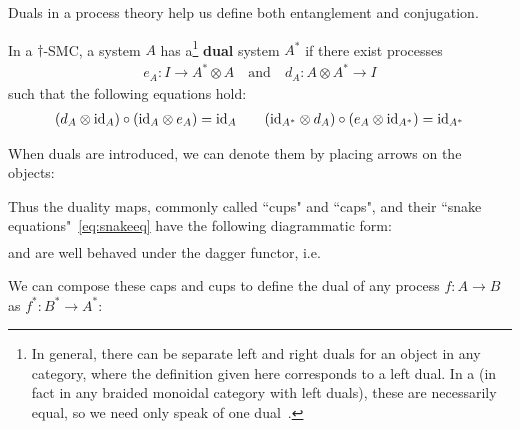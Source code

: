 Duals in a process theory help us define both entanglement and conjugation.

\begin{defn}
\label{def:dual}
In a $\dagger$-SMC, a system $A$ has a\footnote{In general, there can be separate left and right duals for an object in any category, where the definition given here corresponds to a left dual. In a \dsmc(in fact in any braided monoidal category with left duals), these are necessarily equal, so we need only speak of one dual~\cite[Prop.~7.2]{joyal1993braided}. } \textbf{dual} system $A^*$ if there exist processes 
\begin{align}
e_A:I\to A^*\otimes A \quad \mbox{and}\quad d_A:A\otimes A^*\to I
\end{align}
such that the following equations hold:
\begin{align}
\label{eq:snakeeq}
(d_A\otimes \mbox{id}_{A})\circ(\mbox{id}_{A}\otimes e_A) = \mbox{id}_{A} \qquad (\mbox{id}_{A^*}\otimes d_A)\circ(e_A\otimes \mbox{id}_{A^*})=\mbox{id}_{A^*}
\end{align}
\end{defn}

When duals are introduced, we can denote them by placing arrows on the objects:
\begin{equation}

\end{equation}

Thus the duality maps, commonly called ``cups" and ``caps", and their ``snake equations"~\eqref{eq:snakeeq} have the following diagrammatic form:
\begin{align}

\end{align}
\begin{equation}
\label{eq:snake}

\end{equation} 
\noindent and are well behaved under the dagger functor, i.e.
\begin{equation}

\end{equation}

We can compose these caps and cups to define the dual of any process $f:A\to B$ as $f^*:B^*\to A^*$:
\begin{equation}
\label{eq:dualmorph}

\end{equation}

